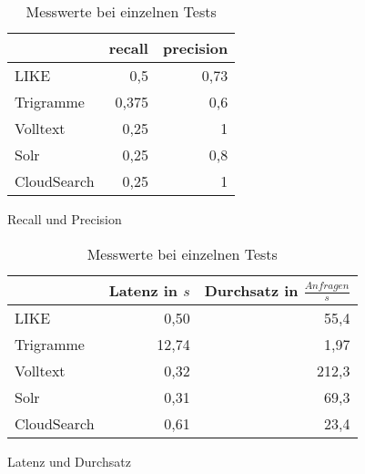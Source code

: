 \renewcommand{\arraystretch}{1.2}
\begin{table}[ht!]
\begin{subtable}[c]{0.45\textwidth}
\begin{tabular}{l | rr}
 & recall & precision \\
\hline
LIKE & 0,5 & 0,73 \\
Trigramme & 0,375 & 0,6 \\
Volltext & 0,25 & 1 \\
Solr & 0,25 & 0,8 \\
CloudSearch & 0,25 & 1 \\
\end{tabular}
\caption[Recall und Precision]{Recall und Precision}
\label{tab:rec_prec}
\end{subtable}
\begin{subtable}[c]{0.45\textwidth}
\begin{tabular}{l | rr}
 &  Latenz in $s$ & Durchsatz in $\frac{Anfragen}{s}$ \\
\hline
LIKE & 0,50 & 55,4 \\
Trigramme & 12,74 & 1,97 \\
Volltext & 0,32 & 212,3 \\
Solr & 0,31 & 69,3 \\
CloudSearch & 0,61 & 23,4 \\
\end{tabular}
\caption[Latenz und Durchsatz]{Latenz und Durchsatz}
\label{tab:latency_through}
\end{subtable}
\caption{Messwerte bei einzelnen Tests}
\end{table}